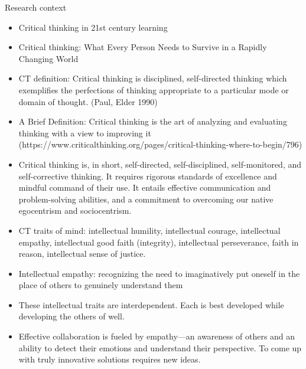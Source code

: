 \begin{frame}[allowframebreaks]{Research context}
\begin{itemize}
    \item Critical thinking in 21st century learning
    \item Critical thinking: What Every Person Needs to Survive in 
        a Rapidly Changing World
    \item CT definition: Critical thinking is disciplined, 
        self-directed thinking which exemplifies the 
        perfections of thinking appropriate to a 
        particular mode or domain of thought.
        (Paul, Elder 1990)
    \item A Brief Definition: Critical thinking is the art of 
        analyzing and evaluating thinking with a view to improving it
        (https://www.criticalthinking.org/pages/critical-thinking-where-to-begin/796)
    \item Critical thinking is, in short, self-directed,
        self-disciplined, self-monitored, and self-corrective 
        thinking. It requires rigorous standards of excellence 
        and mindful command of their use. It entails 
        effective communication and problem-solving 
        abilities, and a commitment to overcoming our 
        native egocentrism and sociocentrism.
    \item CT traits of mind: intellectual humility, 
        intellectual courage, intellectual empathy, intellectual 
        good faith (integrity), intellectual perseverance, 
        faith in reason, intellectual sense of justice.
    \item Intellectual empathy: recognizing the need to imaginatively
        put oneself in the place of others to genuinely 
        understand them
    \item These intellectual traits are interdependent. Each is best 
        developed while developing the others of well. 
    \item Effective collaboration is fueled by empathy—an awareness of
        others and an ability to detect their emotions and 
        understand their perspective. To come up with truly 
        innovative solutions requires new ideas.
\end{itemize}
\end{frame}

